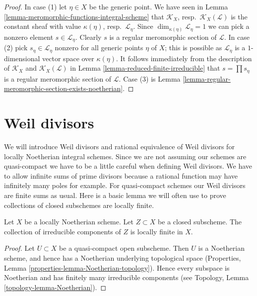 \begin{proof}
In case (1) let $\eta \in X$ be the generic point. We have seen in
Lemma \ref{lemma-meromorphic-functions-integral-scheme}
that $\mathcal{K}_X$, resp.\ $\mathcal{K}_X(\mathcal{L})$
is the constant sheaf with value
$\kappa(\eta)$, resp.\ $\mathcal{L}_\eta$.
Since $\dim_{\kappa(\eta)} \mathcal{L}_\eta = 1$
we can pick a nonzero element $s \in \mathcal{L}_\eta$.
Clearly $s$ is a regular meromorphic section of $\mathcal{L}$.
In case (2) pick $s_\eta \in \mathcal{L}_\eta$ nonzero
for all generic points $\eta$ of $X$; this is possible
as $\mathcal{L}_\eta$ is a $1$-dimensional vector space
over $\kappa(\eta)$.
It follows immediately from the description of
$\mathcal{K}_X$ and $\mathcal{K}_X(\mathcal{L})$
in Lemma \ref{lemma-reduced-finite-irreducible}
that $s = \prod s_\eta$ is a regular meromorphic section of $\mathcal{L}$.
Case (3) is Lemma \ref{lemma-regular-meromorphic-section-exists-noetherian}.
\end{proof}






\section{Weil divisors}
\label{section-Weil-divisors}

\noindent
We will introduce Weil divisors and rational equivalence of Weil
divisors for locally Noetherian integral schemes.
Since we are not assuming our schemes are quasi-compact we have
to be a little careful when defining Weil divisors. We have to allow
infinite sums of prime divisors because a rational function may have
infinitely many poles for example. For quasi-compact schemes our
Weil divisors are finite sums as usual. Here is a basic lemma we will
often use to prove collections of closed subschemes are locally finite.

\begin{lemma}
\label{lemma-components-locally-finite}
Let $X$ be a locally Noetherian scheme. Let $Z \subset X$ be a closed
subscheme. The collection of irreducible components of $Z$
is locally finite in $X$.
\end{lemma}

\begin{proof}
Let $U \subset X$ be a quasi-compact open subscheme. Then $U$ is a Noetherian
scheme, and hence has a Noetherian underlying topological space
(Properties, Lemma \ref{properties-lemma-Noetherian-topology}).
Hence every subspace is Noetherian and
has finitely many irreducible components
(see Topology, Lemma \ref{topology-lemma-Noetherian}).
\end{proof}

